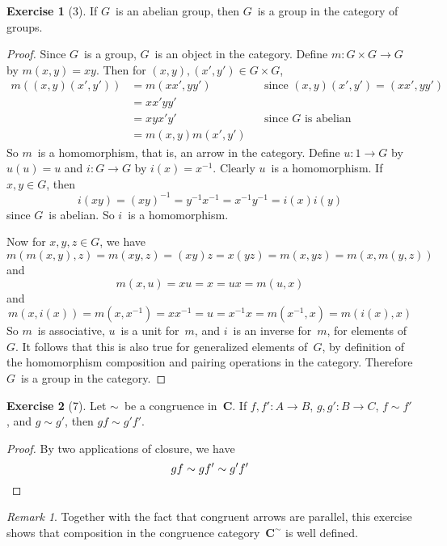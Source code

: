 \documentclass[letterpaper,12pt]{article}
\newcommand{\eq}{\sim}
\newcommand{\cat}[1]{\mathbf{#1}}
\newcommand{\2}{\cat{2}}
\newcommand{\C}{\cat{C}}
\theoremstyle{definition}
\newtheorem*{exer}{Exercise}
\theoremstyle{remark}
\newtheorem*{rmk}{Remark}
\theoremstyle{direction}
\begin{document}
\begin{exer}[3]
If \(G\)~is an abelian group, then \(G\)~is a group in the category of groups.
\end{exer}
\begin{proof}
Since \(G\)~is a group, \(G\)~is an object in the category. Define \(m:G\times G\to G\) by \(m(x,y)=xy\). Then for \((x,y),(x',y')\in G\times G\),
\begin{align*}
m((x,y)(x',y'))&=m(xx',yy')&&\text{since }(x,y)(x',y')=(xx',yy')\\
	&=xx'yy'&&\\
	&=xyx'y'&&\text{since \(G\)~is abelian}\\
	&=m(x,y)m(x',y')&&
\end{align*}
So \(m\)~is a homomorphism, that is, an arrow in the category. Define \(u:1\to G\) by \(u(u)=u\) and \(i:G\to G\) by \(i(x)=x^{-1}\). Clearly \(u\)~is a homomorphism. If \(x,y\in G\), then
\[i(xy)=(xy)^{-1}=y^{-1}x^{-1}=x^{-1}y^{-1}=i(x)i(y)\]
since \(G\)~is abelian. So \(i\)~is a homomorphism.

Now for \(x,y,z\in G\), we have
\[m(m(x,y),z)=m(xy,z)=(xy)z=x(yz)=m(x,yz)=m(x,m(y,z))\]
and
\[m(x,u)=xu=x=ux=m(u,x)\]
and
\[m(x,i(x))=m(x,x^{-1})=xx^{-1}=u=x^{-1}x=m(x^{-1},x)=m(i(x),x)\]
So \(m\)~is associative, \(u\)~is a unit for~\(m\), and \(i\)~is an inverse for~\(m\), for elements of~\(G\). It follows that this is also true for generalized elements of~\(G\), by definition of the homomorphism composition and pairing operations in the category. Therefore \(G\)~is a group in the category.
\end{proof}

\begin{exer}[7]
Let \(\eq\)~be a congruence in~\(\C\). If \(f,f':A\to B\), \(g,g':B\to C\), \(f\eq f'\), and \(g\eq g'\), then \(gf\eq g'f'\).
\end{exer}
\begin{proof}
By two applications of closure, we have
\[gf\eq gf'\eq g'f'\qedhere\]
\end{proof}
\begin{rmk}
Together with the fact that congruent arrows are parallel, this exercise shows that composition in the congruence category~\(\C^{\eq}\) is well defined.
\end{rmk}
\end{document}

